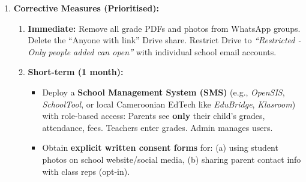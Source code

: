 \documentclass[11pt]{article}
\begin{document}
\begin{exoresolu}
\begin{enumerate}
\begin{itemize}
\begin{enumerate}
                            \item \textbf{Excessive Disclosure (Grades):} Sharing \textit{all} students' grades with \textit{all} parents violates \textit{data minimisation} and \textit{confidentiality}. Each parent should only access their own child's data.
                            \item \textbf{Phone Number Exposure:} Sharing parents' numbers with 50+ strangers (other parents) without consent violates \textit{privacy by design} and \textit{security of processing}.
                            \item \textbf{Insecure Storage (Google Drive):} \textit{``Anyone with the link can view''} = \textbf{public access}. No access control, no encryption at rest (beyond Google's), no audit trail. Violates \textit{integrity and confidentiality} (Art. 32 GDPR / equivalent). High risk of data breach.
                            \item \textbf{No Data Protection Officer (DPO):} School likely hasn't appointed a DPO (mandatory for systematic monitoring of minors).
                            \item \textbf{No Privacy Notice:} Parents/students never informed of their rights (access, rectification, erasure).
                        \end{enumerate}
              \end{itemize}
        \item \textbf{Corrective Measures (Prioritised):}
              \begin{enumerate}
                  \item \textbf{Immediate:} Remove all grade PDFs and photos from WhatsApp groups. Delete the ``Anyone with link'' Drive share. Restrict Drive to \textit{``Restricted - Only people added can open''} with individual school email accounts.
                  \item \textbf{Short-term (1 month):}
                        \begin{itemize}
                            \item Deploy a \textbf{School Management System (SMS)} (e.g., \textit{OpenSIS}, \textit{SchoolTool}, or local Cameroonian EdTech like \textit{EduBridge}, \textit{Klasroom}) with role-based access: Parents see \textbf{only} their child's grades, attendance, fees. Teachers enter grades. Admin manages users.
                            \item Obtain \textbf{explicit written consent forms} for: (a) using student photos on school website/social media, (b) sharing parent contact info with class reps (opt-in).

\end{itemize}
\end{enumerate}
\end{enumerate}
\end{exoresolu}
\end{document}
